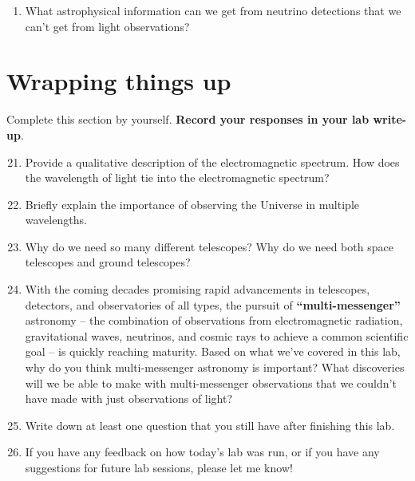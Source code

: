 \documentclass[11pt]{article}
\begin{document}
\begin{enumerate}
\begin{enumerate} [label=(\alph*)]
        \item What astrophysical information can we get from neutrino detections that we can't get from light observations?
    \end{enumerate}
    
\end{enumerate}

\bigskip 

\section{Wrapping things up}

Complete this section by yourself. \textbf{Record your responses in your lab write-up}.
\begin{enumerate}
    \setcounter{enumi}{20}
    \item Provide a qualitative description of the electromagnetic spectrum. How does the wavelength of light tie into the electromagnetic spectrum?
    
    \item Briefly explain the importance of observing the Universe in multiple wavelengths. 
    
    \item Why do we need so many different telescopes? Why do we need both space telescopes and ground telescopes?
    
    \item With the coming decades promising rapid advancements in telescopes, detectors, and observatories of all types, the pursuit of \textbf{``multi-messenger''} astronomy -- the combination of observations from electromagnetic radiation, gravitational waves, neutrinos, and cosmic rays to achieve a common scientific goal -- is quickly reaching maturity. Based on what we've covered in this lab, why do you think multi-messenger astronomy is important? What discoveries will we be able to make with multi-messenger observations that we couldn't have made with just observations of light?  
    
    \item Write down at least one question that you still have after finishing this lab.
    
    \item If you have any feedback on how today's lab was run, or if you have any suggestions for future lab sessions, please let me know!
    
\end{enumerate}
\end{document}
